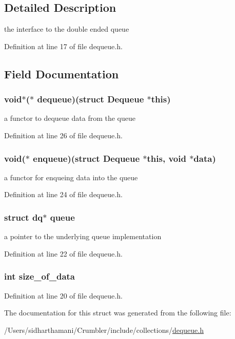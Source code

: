 \subsection{Detailed Description}
the interface to the double ended queue 

Definition at line 17 of file dequeue.\-h.



\subsection{Field Documentation}
\hypertarget{structdequeue_aaaa21837723622119f76d2fa67ac51fc}{
\subsubsection[{dequeue}]{\setlength{\rightskip}{0pt plus 5cm}void$\ast$($\ast$ {\bf dequeue})(struct Dequeue $\ast$this)}}\label{structdequeue_aaaa21837723622119f76d2fa67ac51fc}
a functor to dequeue data from the queue 

Definition at line 26 of file dequeue.\-h.

\hypertarget{structdequeue_afd7779266d6b9dda030846a62fa26fad}{
\subsubsection[{enqueue}]{\setlength{\rightskip}{0pt plus 5cm}void($\ast$ enqueue)(struct Dequeue $\ast$this, void $\ast$data)}}\label{structdequeue_afd7779266d6b9dda030846a62fa26fad}
a functor for enqueing data into the queue 

Definition at line 24 of file dequeue.\-h.

\hypertarget{structdequeue_a51fbcea7276e827ff78ca4c6a9d66d3e}{
\subsubsection[{queue}]{\setlength{\rightskip}{0pt plus 5cm}struct {\bf dq}$\ast$ queue}}\label{structdequeue_a51fbcea7276e827ff78ca4c6a9d66d3e}
a pointer to the underlying queue implementation 

Definition at line 22 of file dequeue.\-h.

\hypertarget{structdequeue_a8b1cacb0a459b9994cf7f0653e366d04}{
\subsubsection[{size\-\_\-of\-\_\-data}]{\setlength{\rightskip}{0pt plus 5cm}int size\-\_\-of\-\_\-data}}\label{structdequeue_a8b1cacb0a459b9994cf7f0653e366d04}


Definition at line 20 of file dequeue.\-h.



The documentation for this struct was generated from the following file\-:\begin{DoxyCompactItemize}
\item 
/\-Users/sidharthamani/\-Crumbler/include/collections/\hyperlink{dequeue_8h}{dequeue.\-h}\end{DoxyCompactItemize}
